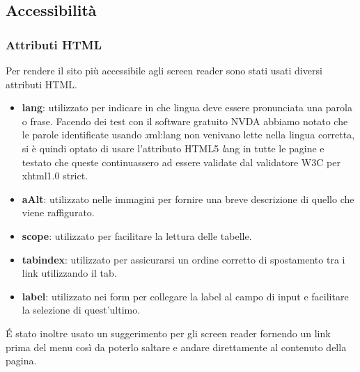 \documentclass{article}
\begin{document}
		\subsection{Accessibilità}
			\subsubsection{Attributi HTML}
				Per rendere il sito più accessibile agli screen reader sono stati usati diversi attributi HTML.
					\begin{itemize}
						\item {\bfseries lang}: utilizzato per indicare in che lingua deve essere pronunciata una parola o frase. Facendo dei test con il software gratuito NVDA abbiamo notato che le parole identificate usando {\textit xml:lang} non venivano lette nella lingua corretta, si è quindi optato di usare l'attributo HTML5 {\textit lang} in tutte le pagine e testato che queste continuassero ad essere validate dal validatore W3C per xhtml1.0 strict.
						\item  {\bfseries aAlt}: utilizzato nelle immagini per fornire una breve descrizione di quello che viene raffigurato.
						\item {\bfseries scope}: utilizzato per facilitare la lettura delle tabelle.
						\item  {\bfseries tabindex}: utilizzato per assicurarsi un ordine corretto di spostamento tra i link utilizzando il tab.
						\item  {\bfseries label}: utilizzato nei form per collegare la label al campo di input e facilitare la selezione di quest'ultimo.
					\end{itemize}
				\'E stato inoltre usato un suggerimento per gli screen reader fornendo un link prima del menu così da poterlo saltare e andare direttamente al contenuto della pagina. 
\end{document}
